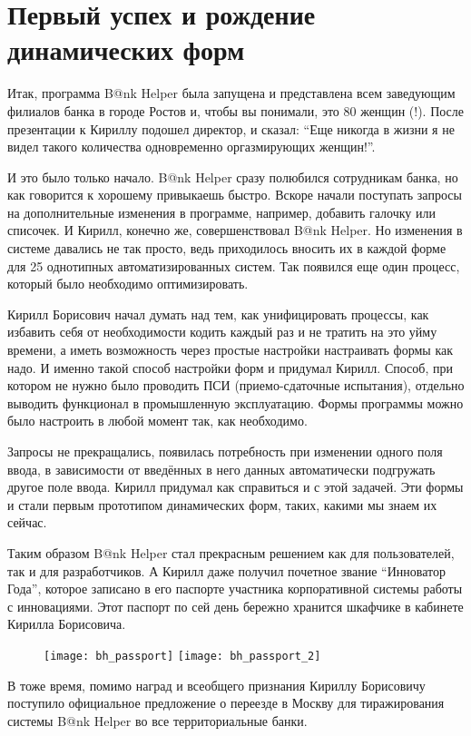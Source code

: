 \documentclass[../index.tex]{subfiles}
\begin{document}
\section{Первый успех и рождение динамических форм}

Итак, программа B@nk Helper была запущена и представлена всем заведующим филиалов банка в городе Ростов и, чтобы вы понимали, это 80 женщин (!). 
После презентации к Кириллу подошел директор, и сказал:
“Еще никогда в жизни я не видел такого количества одновременно оргазмирующих женщин!”.



И это было только начало. B@nk Helper сразу полюбился сотрудникам банка, но как говорится к хорошему привыкаешь быстро. Вскоре начали поступать запросы на дополнительные изменения в программе, например, добавить галочку или списочек. И Кирилл, конечно же,  совершенствовал B@nk Helper. Но изменения в системе давались не так просто, ведь приходилось вносить их в каждой форме для 25 однотипных автоматизированных систем. Так появился еще один процесс, который было необходимо оптимизировать. 



Кирилл Борисович начал думать над тем, как унифицировать процессы, как избавить себя от необходимости кодить каждый раз и не тратить на это уйму времени, а иметь возможность через простые настройки настраивать формы как надо. И именно такой способ настройки форм и придумал Кирилл. Способ, при котором не нужно было проводить ПСИ (приемо-сдаточные испытания), отдельно выводить функционал в промышленную эксплуатацию.  Формы программы можно было настроить в любой момент так, как необходимо. 



Запросы не прекращались, появилась потребность при изменении одного поля ввода, в зависимости от введённых в него данных автоматически подгружать другое поле ввода. Кирилл придумал как справиться и с этой задачей. Эти формы и стали первым прототипом динамических форм, таких, какими мы знаем их сейчас. 



Таким образом B@nk Helper стал прекрасным решением как для пользователей, так и для разработчиков. А Кирилл даже получил почетное звание “Инноватор Года”, которое записано в его паспорте участника  корпоративной системы работы с инновациями. Этот паспорт по сей день  бережно хранится шкафчике в кабинете Кирилла Борисовича. 

\begin{figure}[h]
	\texttt{[image: bh\_passport]}
	\texttt{[image: bh\_passport\_2]}
	\centering
\end{figure}


В тоже время, помимо наград и всеобщего признания  Кириллу Борисовичу поступило официальное предложение о переезде в Москву для тиражирования  системы B@nk Helper во все территориальные банки.
\end{document}
